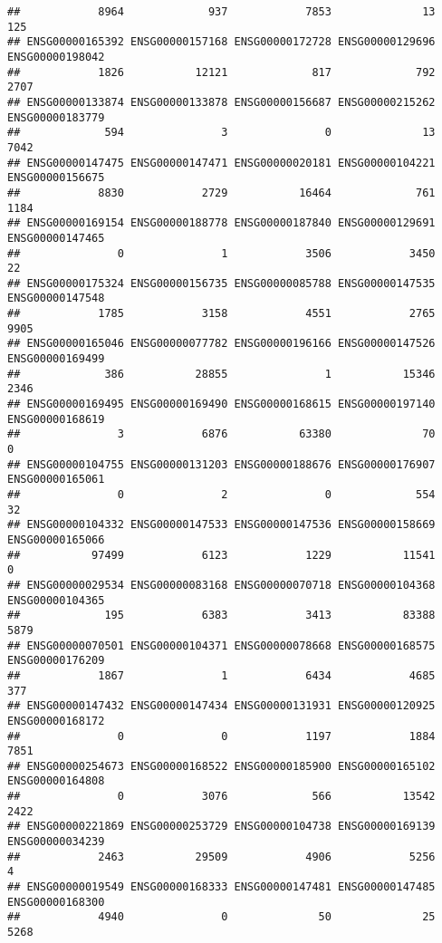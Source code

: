\documentclass[
]{article}
\begin{document}
\begin{verbatim}
##            8964             937            7853              13             125 
## ENSG00000165392 ENSG00000157168 ENSG00000172728 ENSG00000129696 ENSG00000198042 
##            1826           12121             817             792            2707 
## ENSG00000133874 ENSG00000133878 ENSG00000156687 ENSG00000215262 ENSG00000183779 
##             594               3               0              13            7042 
## ENSG00000147475 ENSG00000147471 ENSG00000020181 ENSG00000104221 ENSG00000156675 
##            8830            2729           16464             761            1184 
## ENSG00000169154 ENSG00000188778 ENSG00000187840 ENSG00000129691 ENSG00000147465 
##               0               1            3506            3450              22 
## ENSG00000175324 ENSG00000156735 ENSG00000085788 ENSG00000147535 ENSG00000147548 
##            1785            3158            4551            2765            9905 
## ENSG00000165046 ENSG00000077782 ENSG00000196166 ENSG00000147526 ENSG00000169499 
##             386           28855               1           15346            2346 
## ENSG00000169495 ENSG00000169490 ENSG00000168615 ENSG00000197140 ENSG00000168619 
##               3            6876           63380              70               0 
## ENSG00000104755 ENSG00000131203 ENSG00000188676 ENSG00000176907 ENSG00000165061 
##               0               2               0             554              32 
## ENSG00000104332 ENSG00000147533 ENSG00000147536 ENSG00000158669 ENSG00000165066 
##           97499            6123            1229           11541               0 
## ENSG00000029534 ENSG00000083168 ENSG00000070718 ENSG00000104368 ENSG00000104365 
##             195            6383            3413           83388            5879 
## ENSG00000070501 ENSG00000104371 ENSG00000078668 ENSG00000168575 ENSG00000176209 
##            1867               1            6434            4685             377 
## ENSG00000147432 ENSG00000147434 ENSG00000131931 ENSG00000120925 ENSG00000168172 
##               0               0            1197            1884            7851 
## ENSG00000254673 ENSG00000168522 ENSG00000185900 ENSG00000165102 ENSG00000164808 
##               0            3076             566           13542            2422 
## ENSG00000221869 ENSG00000253729 ENSG00000104738 ENSG00000169139 ENSG00000034239 
##            2463           29509            4906            5256               4 
## ENSG00000019549 ENSG00000168333 ENSG00000147481 ENSG00000147485 ENSG00000168300 
##            4940               0              50              25            5268 

\end{verbatim}
\end{document}

